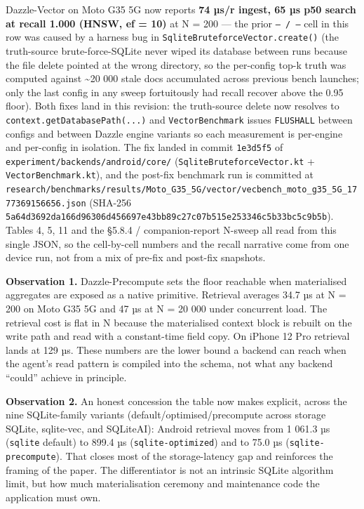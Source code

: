 Dazzle-Vector on Moto G35 5G now reports \textbf{74 µs/r ingest, 65 µs p50
search at recall 1.000 (HNSW, ef = 10)} at N = 200 --- the prior
\texttt{—\ /\ —} cell in this row was caused by a harness bug in
\texttt{SqliteBruteforceVector.create()} (the truth-source brute-force-SQLite
never wiped its database between runs because the file delete pointed at the
wrong directory, so the per-config top-k truth was computed against
\textasciitilde20 000 stale docs accumulated across previous bench launches;
only the last config in any sweep fortuitously had recall recover above the 0.95
floor). Both fixes land in this revision: the truth-source delete now resolves
to \texttt{context.getDatabasePath(...)} and \texttt{VectorBenchmark} issues
\texttt{FLUSHALL} between configs and between Dazzle engine variants so each
measurement is per-engine and per-config in isolation. The fix landed in commit
\texttt{1e3d5f5} of \texttt{experiment/backends/android/core/}
(\texttt{SqliteBruteforceVector.kt} + \texttt{VectorBenchmark.kt}), and the
post-fix benchmark run is committed at
\texttt{research/benchmarks/results/Moto\_G35\_5G/vector/vecbench\_moto\_g35\_5G\_1777369156656.json}
(SHA-256
\texttt{5a64d3692da166d96306d456697e43bb89c27c07b515e253346c5b33bc5c9b5b}).
Tables 4, 5, 11 and the §5.8.4 / companion-report N-sweep all read from this
single JSON, so the cell-by-cell numbers and the recall narrative come from one
device run, not from a mix of pre-fix and post-fix snapshots.

\textbf{Observation 1.} Dazzle-Precompute sets the floor reachable when
materialised aggregates are exposed as a native primitive. Retrieval averages
34.7 µs at N = 200 on Moto G35 5G and 47 µs at N = 20 000 under concurrent load.
The retrieval cost is flat in N because the materialised context block is
rebuilt on the write path and read with a constant-time field copy. On iPhone 12
Pro retrieval lands at 129 µs. These numbers are the lower bound a backend can
reach when the agent's read pattern is compiled into the schema, not what any
backend ``could'' achieve in principle.

\textbf{Observation 2.} An honest concession the table now makes explicit,
across the nine SQLite-family variants (default/optimised/precompute across
storage SQLite, sqlite-vec, and SQLiteAI): Android retrieval moves from 1 061.3
µs (\texttt{sqlite} default) to 899.4 µs (\texttt{sqlite-optimized}) and to 75.0
µs (\texttt{sqlite-precompute}). That closes most of the storage-latency gap and
reinforces the framing of the paper. The differentiator is not an intrinsic
SQLite algorithm limit, but how much materialisation ceremony and maintenance
code the application must own.

